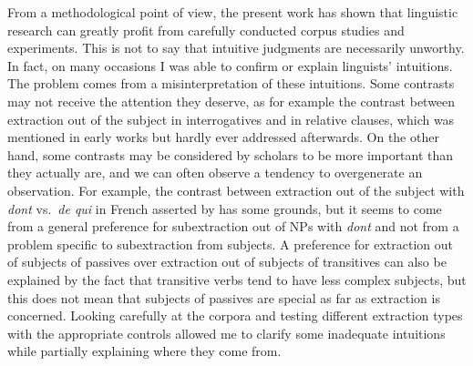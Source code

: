 From a methodological point of view, the present work has shown that linguistic research can greatly profit from carefully conducted corpus studies and experiments. This is not to say that intuitive judgments are necessarily unworthy. In fact, on many occasions I was able to confirm or explain linguists' intuitions. The problem comes from a misinterpretation of these intuitions. Some contrasts may not receive the attention they deserve, as for example the contrast between extraction out of the subject in interrogatives and in relative clauses, which was mentioned in early works \citep[32]{Chomsky.1973} but hardly ever addressed afterwards. On the other hand, some contrasts may be considered by scholars to be more important than they actually are, and we can often observe a tendency to overgenerate an observation. For example, the contrast between extraction out of the subject with \emph{dont} vs.\ \emph{de qui} in French asserted by \citet{Tellier.1991} has some grounds, but it seems to come from a general preference for subextraction out of NPs with \emph{dont} and not from a problem specific to subextraction from subjects. A preference for extraction out of subjects of passives over extraction out of subjects of transitives can also be explained by the fact that transitive verbs tend to have less complex subjects, but this does not mean that subjects of passives are special as far as extraction is concerned. Looking carefully at the corpora and testing different extraction types with the appropriate controls allowed me to clarify some inadequate intuitions while partially explaining where they come from. 



